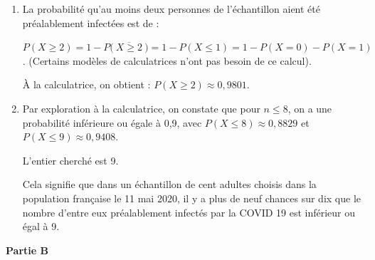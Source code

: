 \begin{enumerate}
\begin{enumerate}
		\item La probabilité qu'au moins deux personnes de l'échantillon aient été préalablement infectées est de :

$P(X \geqslant 2 ) = 1 - P\big(~\overline{X \geqslant 2}~\big) = 1 - P(X \leqslant 1) = 1 - P(X = 0) - P(X = 1)$. (Certains modèles de calculatrices n'ont pas besoin de ce calcul).

À la calculatrice, on obtient : \quad$P(X \geqslant 2) \approx 0,9801$.

		\item Par exploration à la calculatrice, on constate que pour $n \leqslant 8$, on a une probabilité inférieure ou égale à 0,9, avec $P(X \leqslant 8) \approx 0,8829$ et $P(X \leqslant 9) \approx 0,9408$.

L'entier cherché est 9.

Cela signifie que dans un échantillon de cent adultes choisis dans la population française le 11 mai 2020, il y a plus de neuf chances sur dix que le nombre d'entre eux préalablement infectés par la COVID 19 est inférieur ou égal à 9.
	\end{enumerate}
\end{enumerate}

\medskip
\textbf{Partie B}
\medskip

